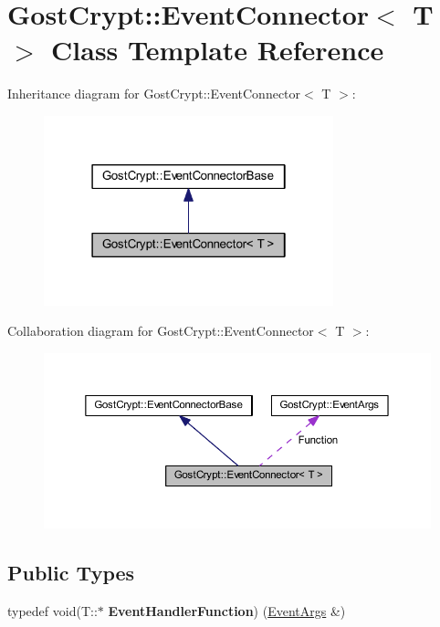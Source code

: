 \hypertarget{class_gost_crypt_1_1_event_connector}{}\section{Gost\+Crypt\+:\+:Event\+Connector$<$ T $>$ Class Template Reference}
\label{class_gost_crypt_1_1_event_connector}


Inheritance diagram for Gost\+Crypt\+:\+:Event\+Connector$<$ T $>$\+:
\nopagebreak
\begin{figure}[H]
\begin{center}
\leavevmode
\includegraphics[width=238pt]{class_gost_crypt_1_1_event_connector__inherit__graph}
\end{center}
\end{figure}


Collaboration diagram for Gost\+Crypt\+:\+:Event\+Connector$<$ T $>$\+:
\nopagebreak
\begin{figure}[H]
\begin{center}
\leavevmode
\includegraphics[width=350pt]{class_gost_crypt_1_1_event_connector__coll__graph}
\end{center}
\end{figure}
\subsection*{Public Types}
\begin{DoxyCompactItemize}
\item 
\mbox{\label{class_gost_crypt_1_1_event_connector_a101aaa7ce470a178b483534db698ee1f}} 
typedef void(T\+::$\ast$ {\bfseries Event\+Handler\+Function}) (\hyperlink{struct_gost_crypt_1_1_event_args}{Event\+Args} \&)
\end{DoxyCompactItemize}
